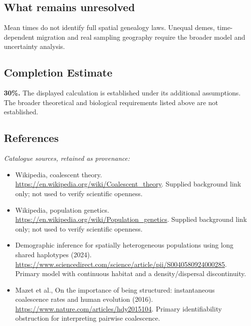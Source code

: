 \documentclass[11pt]{article}
\begin{document}
\subsection{What remains unresolved}
Mean times do not identify full spatial genealogy laws. Unequal demes, time-dependent migration and real sampling geography require the broader model and uncertainty analysis.
\subsection{Completion Estimate}
\textbf{30\%.} The displayed calculation is established under its additional assumptions. The broader theoretical and biological requirements listed above are not established.
\subsection{References}
\noindent\emph{Catalogue sources, retained as provenance:}
\begin{itemize}
\item Wikipedia, coalescent theory. \url{https://en.wikipedia.org/wiki/Coalescent_theory}. Supplied background link only; not used to verify scientific openness.
\item Wikipedia, population genetics. \url{https://en.wikipedia.org/wiki/Population_genetics}. Supplied background link only; not used to verify scientific openness.
\item Demographic inference for spatially heterogeneous populations using long shared haplotypes (2024). \url{https://www.sciencedirect.com/science/article/pii/S0040580924000285}. Primary model with continuous habitat and a density/dispersal discontinuity.
\item Mazet et al., On the importance of being structured: instantaneous coalescence rates and human evolution (2016). \url{https://www.nature.com/articles/hdy2015104}. Primary identifiability obstruction for interpreting pairwise coalescence.
\end{itemize}
\clearpage


\appendix
\end{document}
